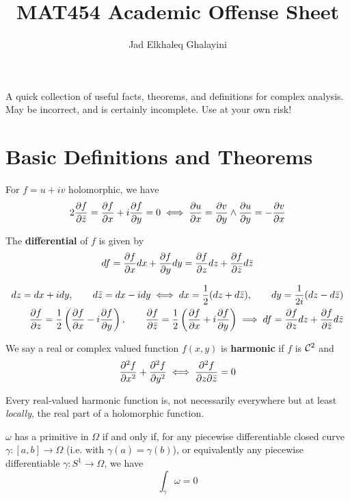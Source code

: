 \documentclass{article}
\title{MAT454 Academic Offense Sheet}
\author{Jad Elkhaleq Ghalayini}
\begin{document}
\maketitle

A quick collection of useful facts, theorems, and definitions for complex analysis. May be incorrect, and is certainly incomplete. Use at your own risk!

\tableofcontents

\newpage

\section{Basic Definitions and Theorems}
For \(f = u + iv\) holomorphic, we have
\begin{equation}
  2{\frac{\partial {f}}{\partial {\bar{z}}}} = {\frac{\partial {f}}{\partial {x}}} + i{\frac{\partial {f}}{\partial {y}}} = 0
  \iff {\frac{\partial {u}}{\partial {x}}} = {\frac{\partial {v}}{\partial {y}}} \land {\frac{\partial {u}}{\partial {y}}} = -{\frac{\partial {v}}{\partial {x}}}
\end{equation}
\begin{definition}
The \textbf{differential} of \(f\) is given by
\begin{equation}
  df = {\frac{\partial {f}}{\partial {x}}}dx + {\frac{\partial {f}}{\partial {y}}}dy = {\frac{\partial {f}}{\partial {z}}}dz + {\frac{\partial {f}}{\partial {\bar{z}}}}d\bar{z}
\end{equation}
\end{definition}
\begin{align}
  dz = dx + idy, \qquad d\bar{z} = dx - idy \iff
  dx = \frac{1}{2}(dz + d\bar{z}), \qquad dy = \frac{1}{2i}(dz - d\bar{z}) \\
  {\frac{\partial {f}}{\partial {z}}} = \frac{1}{2}\left({\frac{\partial {f}}{\partial {x}}} - i{\frac{\partial {f}}{\partial {y}}}\right),
    \qquad {\frac{\partial {f}}{\partial {\bar{z}}}}
    = \frac{1}{2}\left({\frac{\partial {f}}{\partial {x}}} + i{\frac{\partial {f}}{\partial {y}}}\right)
    \implies df = {\frac{\partial {f}}{\partial {z}}}dz + {\frac{\partial {f}}{\partial {\bar{z}}}}d\bar{z}
\end{align}
\begin{definition}[Harmonic]
We say a real or complex valued function \(f(x, y)\) is \textbf{harmonic} if \(f\) is \(\mathcal{C}^2\) and
\begin{equation}
  {\frac{\partial {^2f}}{\partial {x^2}}} + {\frac{\partial {^2f}}{\partial {y^2}}} \iff {\frac{\partial {^2f}}{\partial {z\partial\bar{z}}}} = 0
\end{equation}
\end{definition}
\begin{proposition}
  Every real-valued harmonic function is, not necessarily everywhere but at least \textit{locally}, the real part of a holomorphic function.
\end{proposition}

\begin{theorem}
  \(\omega\) has a primitive in \(\Omega\) if and only if, for any piecewise differentiable closed curve \(\gamma: [a, b] \to \Omega\) (i.e. with \(\gamma(a) = \gamma(b)\)), or equivalently any piecewise differentiable \(\gamma: S^1 \to \Omega\), we have
  \begin{equation}
    \int_\gamma\omega = 0
  \end{equation}
\end{theorem}
\end{document}
